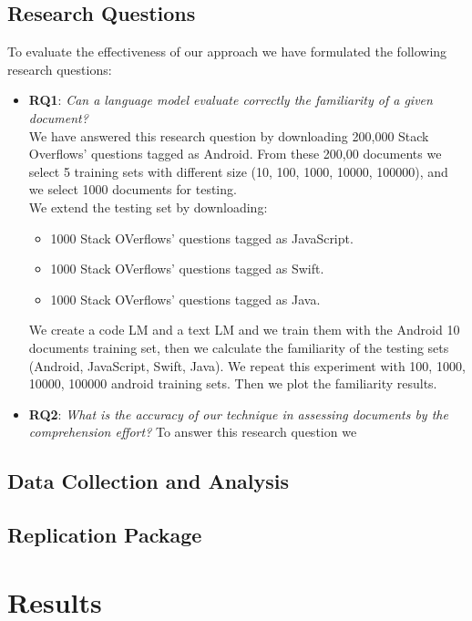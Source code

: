 \documentclass[12pt,mscthesis]{usiinfthesis}
\begin{document}
	\section{Research Questions}
	To evaluate the effectiveness of our approach we have formulated the following research questions:\\
	\newpage
	\begin{itemize}
		\item \textbf{RQ1}: \emph{Can a language model evaluate correctly the familiarity of a given document?}\\
		We have answered this research question by downloading 200,000 Stack Overflows' questions tagged as Android. From these 200,00 documents we select 5 training sets with different size (10, 100, 1000, 10000, 100000), and we select 1000 documents for testing.\\ We extend the testing set by downloading: 
		\begin{itemize}
			\item 1000 Stack OVerflows' questions tagged as JavaScript.
			\item 1000 Stack OVerflows' questions tagged as Swift.
			\item 1000 Stack OVerflows' questions tagged as Java.
		\end{itemize}

		We create a code LM and a text LM and we train them with the Android 10 documents training set, then we calculate the familiarity of the testing sets
		(Android, JavaScript, Swift, Java). We repeat this experiment with 100, 1000, 10000, 100000 android training sets. Then we plot the familiarity results.

		\item \textbf{RQ2}: \emph{What is the accuracy of our technique in assessing documents by the comprehension effort?}
		To answer this research question we 
	\end{itemize}


	\section{Data Collection and Analysis}	
	\section{Replication Package}

\chapter{Results}
\end{document}

